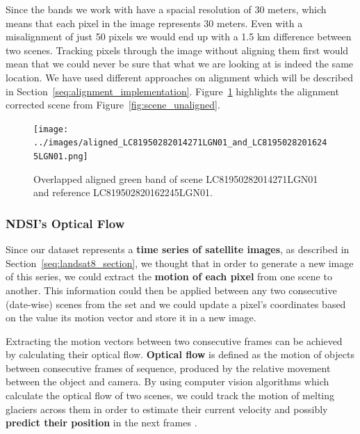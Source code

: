 \documentclass[12pt, a4paper]{report}
\begin{document}
	\par Since the bands we work with have a spacial resolution of 30 meters, which means that each pixel in the image represents 30 meters. Even with a misalignment of just 50 pixels we would end up with a 1.5 km difference between two scenes. Tracking pixels through the image without aligning them first would mean that we could never be sure that what we are looking at is indeed the same location. We have used different approaches on alignment which will be described in Section~\ref{seq:alignment_implementation}. Figure~\ref{fig:scene_aligned} highlights the alignment corrected scene from Figure~\ref{fig:scene_unaligned}. 
	
	\begin{figure}[h!]
		\centering
		\texttt{[image: ../images/aligned\_LC81950282014271LGN01\_and\_LC81950282016245LGN01.png]}
		\caption{Overlapped aligned green band of scene LC81950282014271LGN01 and reference LC819502820162245LGN01.}
		\label{fig:scene_aligned}
	\end{figure}

	\subsubsection{NDSI's Optical Flow}
	\label{seq:ndsi_motion_matrix}
	
	\par Since our dataset represents a \textbf{time series of satellite images}, as described in Section~\ref{seq:landsat8_section}, we thought that in order to generate a new image of this series, we could extract the \textbf{motion of each pixel} from one scene to another. This information could then be applied between any two consecutive (date-wise) scenes from the set and we could update a pixel's coordinates based on the value its motion vector and store it in a new image.
	
	\par Extracting the motion vectors between two consecutive frames can be achieved by calculating their optical flow. \textbf{Optical flow} is defined as the motion of objects between consecutive frames of sequence, produced by the relative movement between the object and camera. By using computer vision algorithms which calculate the optical flow of two scenes, we could track the motion of melting glaciers across them in order to estimate their current velocity and possibly \textbf{predict their position} in the next frames \cite{opticalflow}.
	
\end{document}
